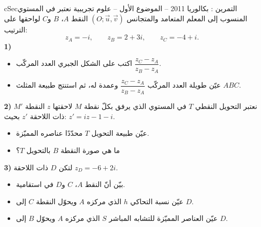 \documentclass[12pt,a4paper]{article}
\newenvironment{BOX}[2]{\begin{otherlanguage}{english}\begin{arbox}{#1}{#2}}{\end{arbox}\end{otherlanguage}}
\newcounter{exo}
\newenvironment{tamrin}[1]{\stepcounter{exo}\begin{BOX}{cSec}{التمرين \theexo: #1}}{\end{BOX}}
\newenvironment{sq}{\begin{itemize}[leftmargin=2.4em,itemsep=3pt]}{\end{itemize}}
\newcommand{\qa}{\item[(أ)]}\newcommand{\qb}{\item[(ب)]}\newcommand{\qc}{\item[(جـ)]}\newcommand{\qd}{\item[(د)]}\newcommand{\qe}{\item[(هـ)]}
\begin{document}
\begin{tamrin}{بكالوريا 2011 -- الموضوع الأول -- علوم تجريبية}
نعتبر في المستوي المنسوب إلى المعلم المتعامد والمتجانس $(O;\vec u,\vec v)$ النقط $A$، $B$ و$C$ لواحقها على الترتيب:
\[z_A=-i,\qquad z_B=2+3i,\qquad z_C=-4+i .\]
\textbf{1)}
\begin{sq}
\qa اكتب على الشكل الجبري العدد المركّب $\dfrac{z_C-z_A}{z_B-z_A}$.
\qb عيّن طويلة العدد المركّب $\dfrac{z_C-z_A}{z_B-z_A}$ وعمدة له، ثم استنتج طبيعة المثلث $ABC$.
\end{sq}
\textbf{2)} نعتبر التحويل النقطي $T$ في المستوي الذي يرفق بكلّ نقطة $M$ لاحقتها $z$ النقطة $M'$ ذات اللاحقة $z'$ بحيث: $z'=iz-1-i$.
\begin{sq}
\qa عيّن طبيعة التحويل $T$ محدّدًا عناصره المميّزة.
\qb ما هي صورة النقطة $B$ بالتحويل $T$؟
\end{sq}
\textbf{3)} لتكن $D$ ذات اللاحقة $z_D=-6+2i$.
\begin{sq}
\qa بيّن أنّ النقط $A$، $C$ و$D$ في استقامية.
\qb عيّن نسبة التحاكي $h$ الذي مركزه $A$ ويحوّل النقطة $C$ إلى $D$.
\qc عيّن العناصر المميّزة للتشابه المباشر $S$ الذي مركزه $A$ ويحوّل $B$ إلى $D$.
\end{sq}
\end{tamrin}
\end{document}
